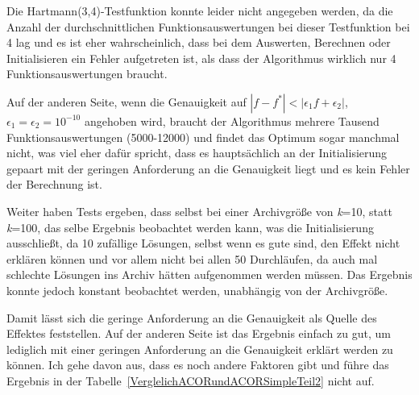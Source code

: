\documentclass[fontsize=12, a4aper]{scrartcl}
\begin{document}
	Die Hartmann(3,4)-Testfunktion konnte leider nicht angegeben werden, da die Anzahl der durchschnittlichen Funktionsauswertungen bei dieser Testfunktion bei 4 lag und es ist eher wahrscheinlich, dass bei dem Auswerten, Berechnen oder Initialisieren ein Fehler aufgetreten ist, als dass der Algorithmus wirklich nur 4 Funktionsauswertungen braucht.\hfill\newline
	
	Auf der anderen Seite, wenn die Genauigkeit auf \(|f-f^*|<|\epsilon_1f + \epsilon_2|\), \(\epsilon_1=\epsilon_2=10^{-10}\) angehoben wird, braucht der Algorithmus mehrere Tausend Funktionsauswertungen (5000-12000) und findet das Optimum sogar manchmal nicht, was viel eher dafür spricht, dass es hauptsächlich an der Initialisierung gepaart mit der geringen Anforderung an die Genauigkeit liegt und es kein Fehler der Berechnung ist.\hfill\newline
	
	Weiter haben Tests ergeben, dass selbst bei einer Archivgröße von \textit{k}=10, statt \textit{k}=100, das selbe Ergebnis beobachtet werden kann, was die Initialisierung ausschließt, da 10 zufällige Lösungen, selbst wenn es gute sind, den Effekt nicht erklären können und vor allem nicht bei allen 50 Durchläufen, da auch mal schlechte Lösungen ins Archiv hätten aufgenommen werden müssen. Das Ergebnis konnte jedoch konstant beobachtet werden, unabhängig von der Archivgröße.\hfill\newline
	
	Damit lässt sich die geringe Anforderung an die Genauigkeit als Quelle des Effektes feststellen. Auf der anderen Seite ist das Ergebnis einfach zu gut, um lediglich mit einer geringen Anforderung an die Genauigkeit erklärt werden zu können. Ich gehe davon aus, dass es noch andere Faktoren gibt und führe das Ergebnis in der Tabelle~\ref{VerglelichACORundACORSimpleTeil2} nicht auf.
	
\end{document}
